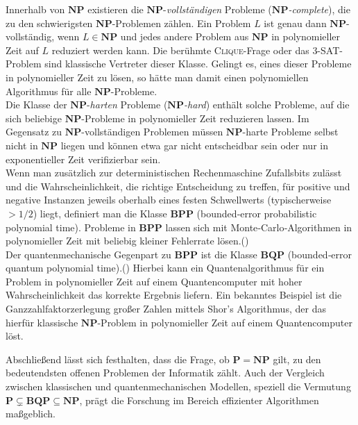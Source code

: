 Innerhalb von \(\mathbf{NP}\) existieren die \(\mathbf{NP}\)-\emph{vollständigen} Probleme (\(\mathbf{NP}\)\emph{-complete}), die zu den schwierigsten \(\mathbf{NP}\)-Problemen zählen. Ein Problem \(L\) ist genau dann \(\mathbf{NP}\)-vollständig, wenn \(L\in\mathbf{NP}\) und jedes andere Problem aus \(\mathbf{NP}\) in polynomieller Zeit auf \(L\) reduziert werden kann. Die berühmte \textsc{Clique}-Frage oder das \textsc{3-SAT}-Problem sind klassische Vertreter dieser Klasse. Gelingt es, eines dieser Probleme in polynomieller Zeit zu lösen, so hätte man damit einen polynomiellen Algorithmus für alle \(\mathbf{NP}\)-Probleme.\\

Die Klasse der \(\mathbf{NP}\)-\emph{harten} Probleme (\(\mathbf{NP}\)\emph{-hard}) enthält solche Probleme, auf die sich beliebige \(\mathbf{NP}\)-Probleme in polynomieller Zeit reduzieren lassen. Im Gegensatz zu \(\mathbf{NP}\)-vollständigen Problemen müssen \(\mathbf{NP}\)-harte Probleme selbst nicht in \(\mathbf{NP}\) liegen und können etwa gar nicht entscheidbar sein oder nur in exponentieller Zeit verifizierbar sein.\\

Wenn man zusätzlich zur deterministischen Rechenmaschine Zufallsbits zulässt und die Wahrscheinlichkeit, die richtige Entscheidung zu treffen, für positive und negative Instanzen jeweils oberhalb eines festen Schwellwerts (typischerweise \(>1/2\)) liegt, definiert man die Klasse \(\mathbf{BPP}\) (bounded‑error probabilistic polynomial time). Probleme in \(\mathbf{BPP}\) lassen sich mit Monte‑Carlo‑Algorithmen in polynomieller Zeit mit beliebig kleiner Fehlerrate lösen.(\cite{zotero-1212}) \\

Der quantenmechanische Gegenpart zu \(\mathbf{BPP}\) ist die Klasse \(\mathbf{BQP}\) (bounded‑error quantum polynomial time).(\cite{zotero-1212}) Hierbei kann ein Quantenalgorithmus für ein Problem in polynomieller Zeit auf einem Quantencomputer mit hoher Wahrscheinlichkeit das korrekte Ergebnis liefern. Ein bekanntes Beispiel ist die Ganzzahlfaktorzerlegung großer Zahlen mittels Shor’s Algorithmus, der das hierfür klassische \(\mathbf{NP}\)-Problem in polynomieller Zeit auf einem Quantencomputer löst.

Abschließend lässt sich festhalten, dass die Frage, ob \(\mathbf{P}=\mathbf{NP}\) gilt, zu den bedeutendsten offenen Problemen der Informatik zählt. Auch der Vergleich zwischen klassischen und quantenmechanischen Modellen, speziell die Vermutung \(\mathbf{P}\subsetneq \mathbf{BQP}\subseteq \mathbf{NP}\), prägt die Forschung im Bereich effizienter Algorithmen maßgeblich.


\printbibliography

